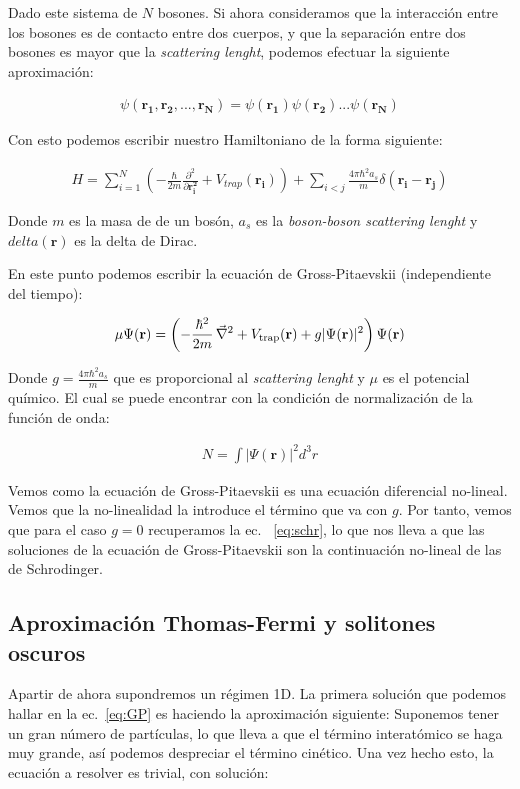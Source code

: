 \documentclass[12pt]{article}
\begin{document}
Dado este sistema de $N$ bosones. Si ahora consideramos que la interacci\'on entre los bosones es de contacto entre dos cuerpos, y que la separaci\'on entre dos bosones es mayor que la \textit{scattering lenght}, podemos efectuar la siguiente aproximaci\'on:
 
\begin{align}
\psi(\mathbf{r_1,r_2,...,r_N})=\psi(\mathbf{r_1})\psi(\mathbf{r_2})...\psi(\mathbf{r_N})
\label{eq:aprox}
\end{align}

Con esto podemos escribir nuestro Hamiltoniano de la forma siguiente:

\begin{align}
H=\sum_{i=1}^{N}(-\frac{\hbar}{2m}\frac{\partial^2}{\partial\mathbf{r_i^2}}+V_{trap}(\mathbf{r_i}))+\sum_{i<j}\frac{4\pi \hbar^2 a_s}{m}
\delta(\mathbf{r_i-r_j})
\label{eq:hamGP}
\end{align}

Donde $m$ es la masa de de un bos\'on, $a_s$ es la \textit{boson-boson scattering lenght} y $delta(\mathbf{r})$ es la delta de Dirac.

En este punto podemos escribir la ecuaci\'on de Gross-Pitaevskii (independiente del tiempo):

\begin{align}
 \mu
\Psi(\mathbf{r}) =\left(-\frac{\hbar^2}{2m} \,\vec{\nabla}^2+V_{\rm trap}(\mathbf{r})+g|\Psi(\mathbf{r})|^2 
\right)\Psi(\mathbf{r})
\label{eq:GP}
\end{align}

Donde $g=\frac{4\pi \hbar^2 a_s}{m}$ que es proporcional al \textit{scattering lenght} y  $\mu$ es el potencial qu\'imico. El cual se puede encontrar con la condici\'on de normalizaci\'on de la funci\'on de onda:

\begin{align}
N=\int |\Psi(\mathbf{r})|^2 d^3r
\label{eq:norma}
\end{align}

Vemos como la ecuaci\'on de Gross-Pitaevskii es una ecuaci\'on diferencial no-lineal. Vemos que la no-linealidad la introduce el t\'ermino que va con $g$. Por tanto, vemos que para el caso $g=0$ recuperamos la ec. ~\eqref{eq:schr}, lo que nos lleva a que las soluciones de la ecuaci\'on de Gross-Pitaevskii son la continuaci\'on no-lineal de las de Schrodinger.

\subsection{Aproximaci\'on Thomas-Fermi y solitones oscuros}
Apartir de ahora supondremos un r\'egimen 1D. La primera soluci\'on que podemos hallar en la ec.~\eqref{eq:GP}  es haciendo la aproximaci\'on siguiente:
Suponemos tener un gran n\'umero de part\'iculas, lo que lleva a que el t\'ermino interat\'omico se haga muy grande, as\'i podemos despreciar el t\'ermino cin\'etico. Una vez hecho esto, la ecuaci\'on a resolver es trivial, con soluci\'on:
 
\end{document}
